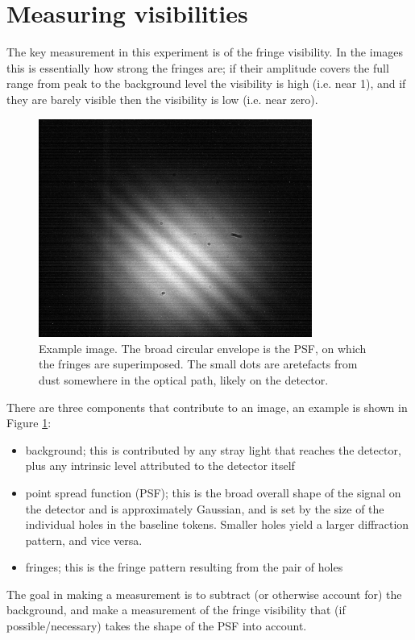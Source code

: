 \documentclass[11pt]{article}
\begin{document}
\section{Measuring visibilities}\label{sec:meas}

The key measurement in this experiment is of the fringe visibility. In the images this is essentially how strong the fringes are; if their amplitude covers the full range from peak to the background level the visibility is high (i.e. near 1), and if they are barely visible then the visibility is low (i.e. near zero).

\begin{figure}[h]
    \centering
    \includegraphics[width=0.8\textwidth]{doc/det-img.png}
    \caption{Example image. The broad circular envelope is the PSF, on which the fringes are superimposed. The small dots are aretefacts from dust somewhere in the optical path, likely on the detector.}
    \label{fig:det-img}
\end{figure}

There are three components that contribute to an image, an example is shown in Figure \ref{fig:det-img}:
\begin{itemize}
    \item background; this is contributed by any stray light that reaches the detector, plus any intrinsic level attributed to the detector itself
    \item point spread function (PSF); this is the broad overall shape of the signal on the detector and is approximately Gaussian, and is set by the size of the individual holes in the baseline tokens. Smaller holes yield a larger diffraction pattern, and vice versa.
    \item fringes; this is the fringe pattern resulting from the pair of holes
\end{itemize}
The goal in making a measurement is to subtract (or otherwise account for) the background, and make a measurement of the fringe visibility that (if possible/necessary) takes the shape of the PSF into account.
\end{document}
